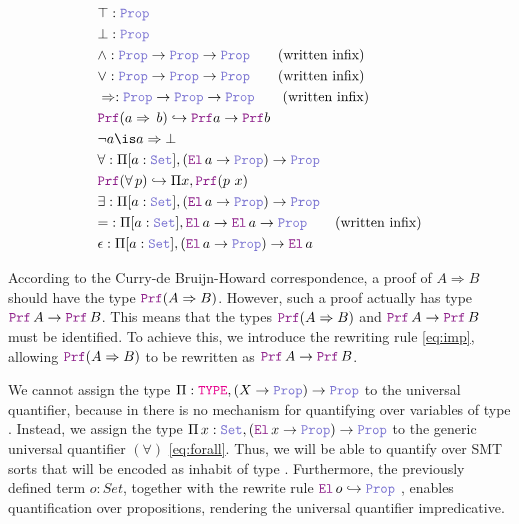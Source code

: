 \begin{definition}
\begin{align}
& \top : \prop \\
& \bot : \prop \\
& \land : \prop \ra \prop \ra \prop \qquad \text{(written inﬁx)} \\
& \lor : \prop \ra \prop \ra \prop \qquad \text{(written inﬁx)} \\
& \Rightarrow : \prop \ra \prop \ra \prop \qquad \text{(written inﬁx)} \\
&  \prf (a \Rightarrow\,b) \re \prf a \ra \prf b \label{eq:imp}\\
& \neg a \is a \Rightarrow \bot \\
& \forall : \Pi {[a: \set]}, (\el\, a \ra \prop) \ra \prop \label{eq:forall}\\
& \prf{}(\forall\,p) \re \Pi x, \prf{(p~x)}\\
& \exists : \Pi {[a: \set]}, (\el\, a \ra \prop) \ra \prop \\
& {=} : \Pi [a : \set], \el\, a \ra \el\, a \ra \prop \qquad \text{(written inﬁx)} \\
& \epsilon: \Pi {[a: \set]}, (\el\,a \ra \prop) \ra \el\,a \\
\end{align}
\end{definition}

According to the Curry-de Bruijn-Howard correspondence, a proof of $A \Rightarrow B$ should have the type $\prf (A \Rightarrow B)$.
However, such a proof actually has type $\prf\,A \ra \prf\,B$. This means that the types $\prf (A \Rightarrow B)$ and $\prf\,A \ra \prf\,B$ must be identiﬁed.
To achieve this, we introduce the rewriting rule \cref{eq:imp}, allowing $\prf (A \Rightarrow B)$ to be rewritten as $\prf\,A \ra \prf\,B$.

We cannot assign the type $\Pi : \type, (X \ra \prop) \ra \prop$ to the universal quantifier, because in \lpm{} there is no mechanism for quantifying over variables of type \type.
Instead, we assign the type $\Pi\,x:\set{},(\el\,x \ra \prop) \ra \prop$ to the generic universal quantiﬁer $(\forall)$ \cref{eq:forall}.
Thus, we will be able to quantify over SMT sorts that will be encoded as inhabit of type \set. Furthermore, the previously defined term $o: Set$, together with the rewrite rule $\el\,o\index{o}  \hookrightarrow \prop$
, enables quantification over propositions, rendering the universal quantifier impredicative.

